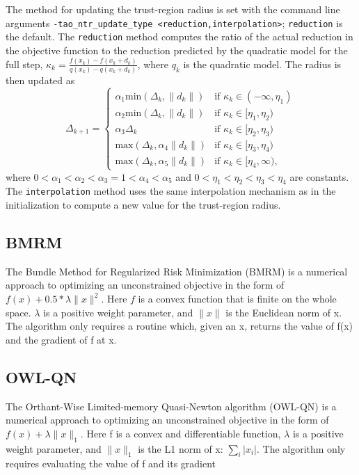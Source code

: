 The method for updating the trust-region radius is set with the 
command line arguments 
{\tt -tao\_ntr\_update\_type <reduction,interpolation>}; {\tt reduction} 
is the default.  The {\tt reduction} method computes the ratio of the 
actual reduction in the objective function to the reduction predicted 
by the quadratic model for the full step, 
$\kappa_k = \frac{f(x_k) - f(x_k + d_k)}{q(x_k) - q(x_k + d_k)}$, where 
$q_k$ is the quadratic model.  The radius is then updated as
\[
\Delta_{k+1} = \left\{\begin{array}{ll}
\alpha_1 \mbox{min}(\Delta_k, \|d_k\|) & \mbox{if } \kappa_k \in (-\infty, \eta_1) \\
\alpha_2 \mbox{min}(\Delta_k, \|d_k\|) & \mbox{if } \kappa_k \in [\eta_1, \eta_2) \\
\alpha_3 \Delta_k & \mbox{if } \kappa_k \in [\eta_2, \eta_3) \\
\mbox{max}(\Delta_k, \alpha_4 \|d_k\|) & \mbox{if } \kappa_k \in [\eta_3, \eta_4) \\
\mbox{max}(\Delta_k, \alpha_5 \|d_k\|) & \mbox{if } \kappa_k \in [\eta_4, \infty),
\end{array}
\right.
\]
where $0 < \alpha_1 < \alpha_2 < \alpha_3 = 1 < \alpha_4 < \alpha_5$ and
$0 < \eta_1 < \eta_2 < \eta_3 < \eta_4$ are constants.  The {\tt interpolation}
method uses the same interpolation mechanism as in the initialization to
compute a new value for the trust-region radius.

\subsection{BMRM}
The Bundle Method for Regularized Risk Minimization (BMRM)\cite{brmrm} is a 
numerical approach to optimizing an unconstrained objective in the form of 
$f(x) + 0.5 * \lambda \| x \|^2$.  Here $f$ is a convex function that is finite on 
the whole space.  $\lambda$ is a positive 
weight parameter, and $\| x \|$ is the Euclidean norm of x.  The algorithm only 
requires a routine which, given an x, returns the value of f(x) and the 
gradient of f at x.

\subsection{OWL-QN}
The Orthant-Wise Limited-memory Quasi-Newton algorithm (OWL-QN)\cite{owlqn}
is a numerical approach to optimizing an unconstrained objective in the 
form of $f(x) + \lambda \|x\|_1$.  Here f is a convex and differentiable 
function, $\lambda$ is a positive weight parameter, and $\| x \|_1$ is the 
L1 norm of x: $\sum_i |x_i|$.  The algorithm only requires evaluating the 
value of f and its gradient

